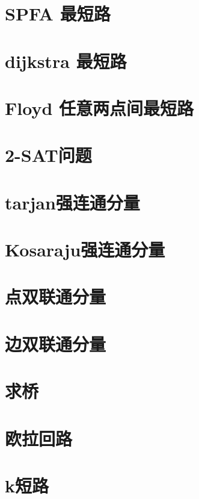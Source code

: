\section{SPFA 最短路}
\raggedbottom
\hrulefill
\section{dijkstra 最短路}
\raggedbottom
\hrulefill
\section{Floyd 任意两点间最短路}
\raggedbottom
\hrulefill
\section{2-SAT问题}
\raggedbottom
\hrulefill
\section{tarjan强连通分量}
\raggedbottom
\hrulefill
\section{Kosaraju强连通分量}
\raggedbottom
\hrulefill
\section{点双联通分量}
\raggedbottom
\hrulefill
\section{边双联通分量}
\raggedbottom
\hrulefill
\section{求桥}
\raggedbottom
\hrulefill
\section{欧拉回路}
\raggedbottom
\hrulefill
\section{k短路}
\raggedbottom
\hrulefill
